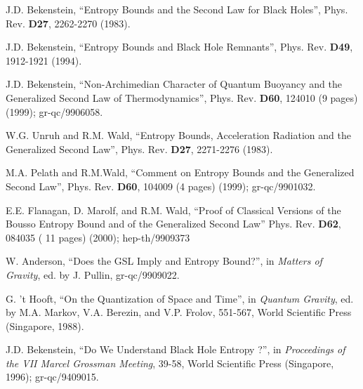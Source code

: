 \documentclass[12pt]{article}
\newcommand{\comment}[1]{}
\newcommand{\keywords}[1]{}
\begin{document}
\begin{thebibliography}{999}
\comment{article} J.D. Bekenstein, ``Entropy Bounds and
the Second Law for Black Holes'', Phys. Rev. {\bf D27}, 2262-2270
(1983).  \keywords{black hole thermodynamics, statistical mechanics,
generalized second law, entropy bounds}

\comment{article} J.D. Bekenstein, ``Entropy Bounds and
Black Hole Remnants'', Phys. Rev. {\bf D49}, 1912-1921 (1994).
\keywords{black hole thermodynamics, statistical mechanics,
generalized second law, entropy bounds}

\comment{article} J.D. Bekenstein, ``Non-Archimedian
Character of Quantum Buoyancy and the Generalized Second Law of
Thermodynamics'', Phys. Rev. {\bf D60}, 124010 (9 pages) (1999);
gr-qc/9906058.  \keywords{black hole thermodynamics, statistical
mechanics, generalized second law, entropy bounds}

\comment{article} W.G. Unruh and R.M. Wald, ``Entropy
Bounds, Acceleration Radiation and the Generalized Second Law'',
Phys. Rev. {\bf D27}, 2271-2276 (1983). \keywords{black hole
thermodynamics, generalized second law, entropy bounds}

\comment{article} M.A. Pelath and R.M.Wald, ``Comment on
Entropy Bounds and the Generalized Second Law'', Phys. Rev. {\bf D60},
104009 (4 pages) (1999); gr-qc/9901032. \keywords{black hole
thermodynamics, generalized second law, entropy bounds}

\comment{article} E.E. Flanagan, D. Marolf, and R.M. Wald,
``Proof of Classical Versions of the Bousso Entropy Bound and of the
Generalized Second Law'' Phys. Rev. {\bf D62}, 084035 ( 11 pages)
(2000); hep-th/9909373 \keywords{black hole thermodynamics,
generalized second law, entropy bounds}

\comment{online} W. Anderson, ``Does the GSL Imply and
Entropy Bound?'', in {\it Matters of Gravity}, ed. by J. Pullin,
gr-qc/9909022.  \keywords{black hole thermodynamics, generalized
second law, entropy bounds}

\comment{inbook} G. 't Hooft, ``On the Quantization of
Space and Time'', in {\it Quantum Gravity}, ed. by M.A. Markov,
V.A. Berezin, and V.P. Frolov, 551-567, World Scientific Press
(Singapore, 1988).  \keywords{quantum gravity, entropy bounds}

\comment{inbook} J.D. Bekenstein, ``Do We Understand Black
Hole Entropy ?'', in {\it Proceedings of the VII Marcel Grossman
Meeting}, 39-58, World Scientific Press (Singapore, 1996); gr-qc/9409015.
\keywords{black hole thermodynamics, generalized second law, entropy
bounds}


\end{thebibliography}
\end{document}
